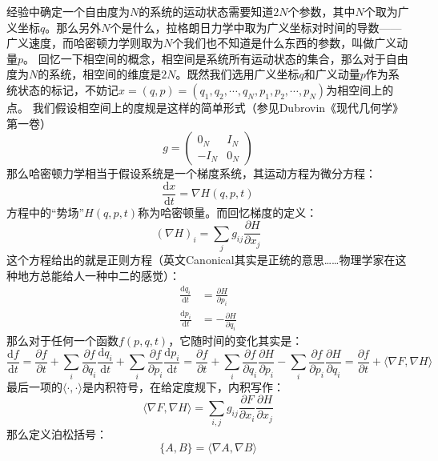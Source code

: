 \documentclass{ctexart}
\begin{document}
经验中确定一个自由度为$N$的系统的运动状态需要知道$2N$个参数，其中$N$个取为广义坐标$q$。那么另外$N$个是什么，拉格朗日力学中取为广义坐标对时间的导数——广义速度，而哈密顿力学则取为$N$个我们也不知道是什么东西的参数，叫做广义动量$p$。
回忆一下相空间的概念，相空间是系统所有运动状态的集合，那么对于自由度为$N$的系统，相空间的维度是$2N$。既然我们选用广义坐标$q$和广义动量$p$作为系统状态的标记，不妨记$x=(q,p)=(q_1,q_2,\cdots,q_N,p_1,p_2,\cdots,p_N)$为相空间上的点。
我们假设相空间上的度规是这样的简单形式（参见Dubrovin《现代几何学》第一卷）
\begin{equation}
g=\begin{pmatrix}0_N & I_N \\-I_N & 0_N \end{pmatrix}
\end{equation}
那么哈密顿力学相当于假设系统是一个梯度系统，其运动方程为微分方程：
\begin{equation}
\frac{\mathrm{d}x}{\mathrm{d}t}=\nabla H(q,p,t)
\end{equation}
方程中的“势场”$H(q,p,t)$称为哈密顿量。而回忆梯度的定义：
\begin{equation}
(\nabla H)_i=\sum_jg_{ij}\frac{\partial H}{\partial x_j}
\end{equation}
这个方程给出的就是正则方程（英文Canonical其实是正统的意思……物理学家在这种地方总能给人一种中二的感觉）：
\begin{align}
\frac{\mathrm{d}q_i}{\mathrm{d}t}&=\frac{\partial H}{\partial p_i} \\
\frac{\mathrm{d}p_i}{\mathrm{d}t}&=-\frac{\partial H}{\partial q_i}
\end{align}
那么对于任何一个函数$f(p,q,t)$，它随时间的变化其实是：
\begin{equation}
\frac{\mathrm{d}f}{\mathrm{d}t}=\frac{\partial f}{\partial t}+\sum_i\frac{\partial f}{\partial q_i}\frac{\mathrm{d} q_i}{\mathrm{d} t}+\sum_i\frac{\partial f}{\partial p_i}\frac{\mathrm{d} p_i}{\mathrm{d} t}=\frac{\partial f}{\partial t}+\sum_i\frac{\partial f}{\partial q_i}\frac{\partial H}{\partial p_i}-\sum_i\frac{\partial f}{\partial p_i}\frac{\partial H}{\partial q_i}=\frac{\partial f}{\partial t}+\langle\nabla F,\nabla H\rangle
\end{equation}
最后一项的$\langle\cdot,\cdot\rangle$是内积符号，在给定度规下，内积写作：
\begin{equation}
\langle\nabla F,\nabla H\rangle=\sum_{i,j}g_{ij}\frac{\partial F}{\partial x_i}\frac{\partial H}{\partial x_j}
\end{equation}
那么定义泊松括号：
\begin{equation}
\{A,B\}=\langle\nabla A,\nabla B\rangle
\end{equation}
\end{document}
